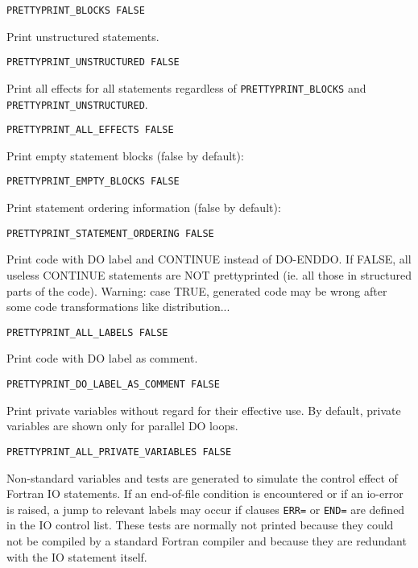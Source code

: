 \begin{verbatim}
PRETTYPRINT_BLOCKS FALSE
\end{verbatim}

Print unstructured statements.

\begin{verbatim}
PRETTYPRINT_UNSTRUCTURED FALSE
\end{verbatim}

Print all effects for all statements regardless of \verb+PRETTYPRINT_BLOCKS+
and \verb+PRETTYPRINT_UNSTRUCTURED+.

\begin{verbatim}
PRETTYPRINT_ALL_EFFECTS FALSE
\end{verbatim}

Print empty statement blocks (false by default):

\begin{verbatim}
PRETTYPRINT_EMPTY_BLOCKS FALSE
\end{verbatim}

Print statement ordering information (false by default):

\begin{verbatim}
PRETTYPRINT_STATEMENT_ORDERING FALSE
\end{verbatim}

Print code with DO label and CONTINUE instead of DO-ENDDO. If FALSE, all
useless CONTINUE statements are NOT prettyprinted (ie. all those in
structured parts of the code). Warning: case TRUE, generated code may be
wrong after some code transformations like distribution...

\begin{verbatim}
PRETTYPRINT_ALL_LABELS FALSE
\end{verbatim}

Print code with DO label as comment.

\begin{verbatim}
PRETTYPRINT_DO_LABEL_AS_COMMENT FALSE
\end{verbatim}

Print private variables without regard for their effective use. By
default, private variables are shown only for parallel DO loops.

\begin{verbatim}
PRETTYPRINT_ALL_PRIVATE_VARIABLES FALSE
\end{verbatim}

Non-standard variables and tests are generated to simulate the control
effect of Fortran IO statements. If an end-of-file condition is
encountered or if an io-error is raised, a jump to relevant labels may
occur if clauses \verb|ERR=| or \verb|END=| are defined in the IO
control list. These tests are normally not printed because they could
not be compiled by a standard Fortran compiler and because they are
redundant with the IO statement itself.

